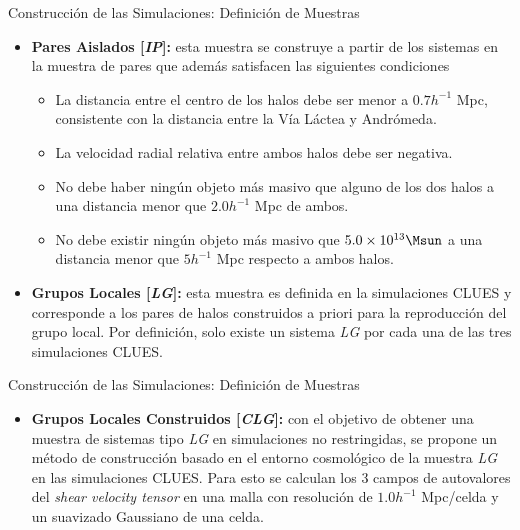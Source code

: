 \documentclass[8pt,fleqn]{beamer}
\begin{document}
\begin{frame}
\begin{block}{Construcción de las Simulaciones: Definición de Muestras}\justifying

\begin{itemize}


\item \textbf{Pares Aislados [\textit{IP}]:} esta muestra se construye
a partir de los sistemas en la muestra de pares que además satisfacen las 
siguientes condiciones

	\begin{itemize}
	\item La distancia entre el centro de los halos debe ser menor a 
	$0.7 h^{-1}$ Mpc, consistente con la distancia entre la Vía Láctea
	y Andrómeda.
	\item La velocidad radial relativa entre ambos halos debe ser negativa.
	\item No debe haber ningún objeto más masivo que alguno de los dos halos
	a una distancia menor que $2.0 h^{-1}$ Mpc de ambos.
	\item No debe existir ningún objeto más masivo que $5.0 \times 10^{13}\Msun$
	a una distancia menor que $5h^{-1}$ Mpc respecto a ambos halos.
	\end{itemize}
	
\item \textbf{Grupos Locales [\textit{LG}]:} esta muestra es 
definida en la simulaciones CLUES y corresponde a los pares de halos 
construidos a priori para la reproducción del grupo local. Por definición, 
solo existe un sistema \textit{LG} por cada una de las tres simulaciones 
CLUES.	
	
\end{itemize}

\end{block}
\end{frame}
\begin{frame}
\begin{block}{Construcción de las Simulaciones: Definición de Muestras}\justifying

\begin{itemize}

\item \textbf{Grupos Locales Construidos [\textit{CLG}]:} con el
objetivo de obtener una muestra de sistemas tipo \textit{LG} en 
simulaciones no restringidas, se propone un método de construcción basado
en el entorno cosmológico de la muestra \textit{LG} en las simulaciones 
CLUES. Para esto se calculan los 3 campos de autovalores del 
\textit{shear velocity tensor} en una malla con resolución de 
$1.0 h^{-1}$ Mpc/celda y un suavizado Gaussiano de una celda.

\end{itemize}

\end{block}
\end{frame}
\end{document}
